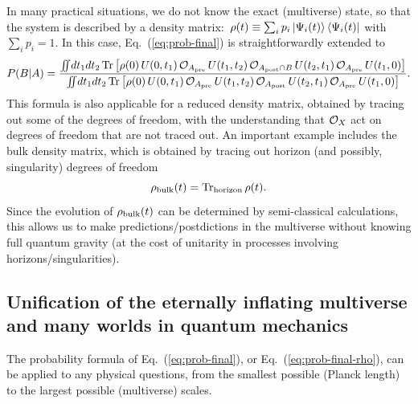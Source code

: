 \documentclass[12pt]{article}
\begin{document}
In many practical situations, we do not know the exact (multiverse) 
state, so that the system is described by a density matrix:\ $\rho(t) 
\equiv \sum_i p_i \left| \Psi_i(t) \right> \left< \Psi_i(t) \right|$ with $\sum_i p_i = 1$. 
In this case, Eq.~(\ref{eq:prob-final}) is straightforwardly extended to
%
{\small\begin{equation}
  P(B|A) = \frac{\int\!\!\!\int\!dt_1 dt_2\, {\rm Tr}\left[ \rho(0)\, 
    U(0,t_1)\, {\cal O}_{A_{\rm pre}}\, U(t_1,t_2)\, 
    {\cal O}_{A_{\rm post} \cap B}\, U(t_2,t_1)\, {\cal O}_{A_{\rm pre}}\, 
    U(t_1,0) \right]}
  {\int\!\!\!\int\!dt_1 dt_2\, {\rm Tr}\left[ \rho(0)\, 
    U(0,t_1)\, {\cal O}_{A_{\rm pre}}\, U(t_1,t_2)\, 
    {\cal O}_{A_{\rm post}}\, U(t_2,t_1)\, {\cal O}_{A_{\rm pre}}\, 
    U(t_1,0) \right]}.
\label{eq:prob-final-rho}
\end{equation}}
%
This formula is also applicable for a reduced density matrix, obtained 
by tracing out some of the degrees of freedom, with the understanding 
that ${\cal O}_X$ act on degrees of freedom that are not traced 
out.  An important example includes the bulk density matrix, which 
is obtained by tracing out horizon (and possibly, singularity) degrees 
of freedom~\cite{Nomura:2011dt}
%
\begin{equation}
  \rho_{\rm bulk}(t) = {\rm Tr}_{\rm horizon}\, \rho(t).
\label{eq:rho-red_bulk}
\end{equation}
%
Since the evolution of $\rho_{\rm bulk}(t)$ can be determined by 
semi-classical calculations, this allows us to make predictions/postdictions 
in the multiverse without knowing full quantum gravity (at the cost of 
unitarity in processes involving horizons/singularities).


\subsection{Unification of the eternally inflating multiverse and many 
 worlds in quantum mechanics}

The probability formula of Eq.~(\ref{eq:prob-final}), or 
Eq.~(\ref{eq:prob-final-rho}), can be applied to any physical 
questions, from the smallest possible (Planck length) to the largest 
possible (multiverse) scales.
\end{document}
